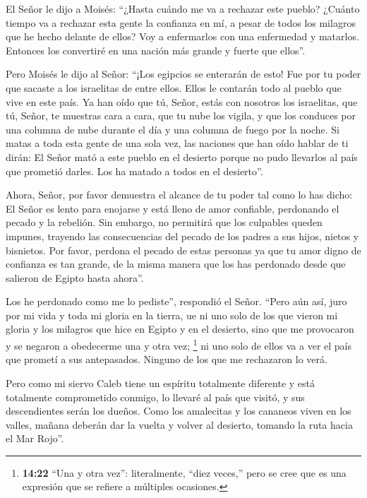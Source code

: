  El Señor le dijo a Moisés: ``¿Hasta cuándo me va a
rechazar este pueblo? ¿Cuánto tiempo va a rechazar esta gente la
confianza en mí, a pesar de todos los milagros que he hecho delante de
ellos?  Voy a enfermarlos con una enfermedad y matarlos.
Entonces los convertiré en una nación más grande y fuerte que ellos''.

 Pero Moisés le dijo al Señor: ``¡Los egipcios se enterarán
de esto! Fue por tu poder que sacaste a los israelitas de entre ellos.
 Ellos le contarán todo al pueblo que vive en este país. Ya
han oído que tú, Señor, estás con nosotros los israelitas, que tú,
Señor, te muestras cara a cara, que tu nube los vigila, y que los
conduces por una columna de nube durante el día y una columna de fuego
por la noche.  Si matas a toda esta gente de una sola vez,
las naciones que han oído hablar de ti dirán:  El Señor
mató a este pueblo en el desierto porque no pudo llevarlos al país que
prometió darles. Los ha matado a todos en el desierto''.

 Ahora, Señor, por favor demuestra el alcance de tu poder
tal como lo has dicho:  El Señor es lento para enojarse y
está lleno de amor confiable, perdonando el pecado y la rebelión. Sin
embargo, no permitirá que los culpables queden impunes, trayendo las
consecuencias del pecado de los padres a sus hijos, nietos y bisnietos.
 Por favor, perdona el pecado de estas personas ya que tu
amor digno de confianza es tan grande, de la misma manera que los has
perdonado desde que salieron de Egipto hasta ahora''.

 Los he perdonado como me lo pediste'', respondió el Señor.
 ``Pero aún así, juro por mi vida y toda mi gloria en la
tierra,  ue ni uno solo de los que vieron mi gloria y los
milagros que hice en Egipto y en el desierto, sino que me provocaron y
se negaron a obedecerme una y otra vez; \footnote{\textbf{14:22} ``Una y
  otra vez'': literalmente, ``diez veces,'' pero se cree que es una
  expresión que se refiere a múltiples ocasiones.}  ni uno
solo de ellos va a ver el país que prometí a sus antepasados. Ninguno de
los que me rechazaron lo verá.

 Pero como mi siervo Caleb tiene un espíritu totalmente
diferente y está totalmente comprometido conmigo, lo llevaré al país que
visitó, y sus descendientes serán los dueños.  Como los
amalecitas y los cananeos viven en los valles, mañana deberán dar la
vuelta y volver al desierto, tomando la ruta hacia el Mar Rojo''.

